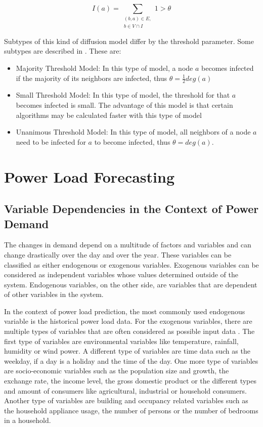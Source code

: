\begin{equation}
    I(a) = \sum\limits_{\substack{(b,a)\in E, \\ b \in V \cap I}}
    1 > \theta    
    \label{eq:threshold}
\end{equation}

Subtypes of this kind of diffusion model differ by the threshold parameter.
Some subtypes are described in \cite{diffusionbasics}. These are:

\begin{itemize}
    \item Majority Threshold Model: In this type of model, a node $a$ becomes
    infected if the majority of its neighbors are infected, thus 
    $\theta = \frac{1}{2}deg(a)$
    \item Small Threshold Model: In this type of model, the threshold for that
    $a$ becomes infected is small. The advantage of this model is that 
    certain algorithms may be calculated faster with this type of model 
    \cite{diffusionbasics} 
    \item Unanimous Threshold Model: In this type of model, all neighbors 
    of a node $a$ need to be infected for $a$ to become infected, thus
    $\theta = deg(a)$.
\end{itemize}


\section{Power Load Forecasting}
\label{powerloadsection}
\subsection{Variable Dependencies in the Context of Power Demand}

The changes in demand depend on a multitude of factors and variables and 
can change drastically over the day and over the year.
These variables can be classified as either endogenous or exogenous variables.
Exogenous variables can be considered as independent variables 
whose values determined outside of the system. 
Endogenous variables, on the other side, 
are variables that are dependent of other variables in the 
system.

In the context of power load prediction, the most commonly 
used endogenous variable is the historical power load data.
For the exogenous variables, there are multiple types of 
variables that are often considered as possible input data \cite{exogenousdata}
\cite{exogenousdata2}.
The first type of variables are environmental variables like temperature, 
rainfall, humidity or wind power. A different type of variables are time data
such as the weekday, if a day is a holiday and the time of the day.
One more type of variables are socio-economic variables such as the
population size and growth, the exchange rate, the income level,
the gross domestic product or the different types and amount 
of consumers like agricultural, industrial or household consumers.
Another type of variables are building and occupancy related variables such
as the household appliance usage,
the number of persons or the number of bedrooms in a household.

